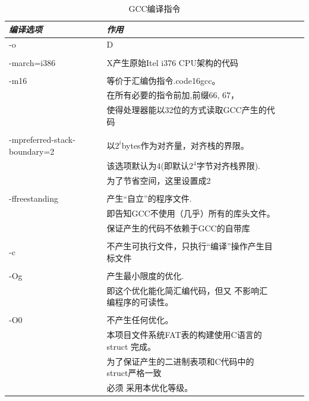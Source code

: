 \documentclass[a4paper]{article}
\begin{document}
    \begin{table}[!htb]
        \caption{GCC编译指令}\label{tab:gcc}
    \begin{tabular}{@{} *5l @{}} 
        \toprule
    \emph{编译选项} & \emph{作用} &&&  \\
        \midrule
        -o    & D  \\ 
        \\ 
        -march=i386  & X产生原始Itel i376 CPU架构的代码\\ 
        \\
        -m16& 等价于汇编伪指令.code16gcc。
            \\& 在所有必要的指令前加,前缀66, 67，
            \\& 使得处理器能以32位的方式读取GCC产生的代码\\
        \\
        -mpreferred-stack-boundary=2 & 以$2^i$bytes作为对齐量，对齐栈的界限。
            \\& 该选项默认为4(即默认$2^4$字节对齐栈界限).
            \\& 为了节省空间，这里设置成2 \\
        \\
        -ffreestanding &  产生``自立''的程序文件.
            \\& 即告知GCC不使用（几乎）所有的库头文件。
            \\& 保证产生的代码不依赖于GCC的自带库 \\
        \\
        -c & 不产生可执行文件，只执行``编译''操作产生目标文件 \\ 
        \\
        -Og & 产生最小限度的优化.
            \\& 即这个优化能化简汇编代码，但又
            不影响汇编程序的可读性。\\
        \\
        -O0 & 不产生任何优化。
            \\& 本项目文件系统FAT表的构建使用C语言的struct
            完成。
            \\& 为了保证产生的二进制表项和C代码中的struct严格一致
            \\& 必须
            采用本优化等级。\\

        \bottomrule
    \hline
    \end{tabular}
    \end{table}
\end{document}
